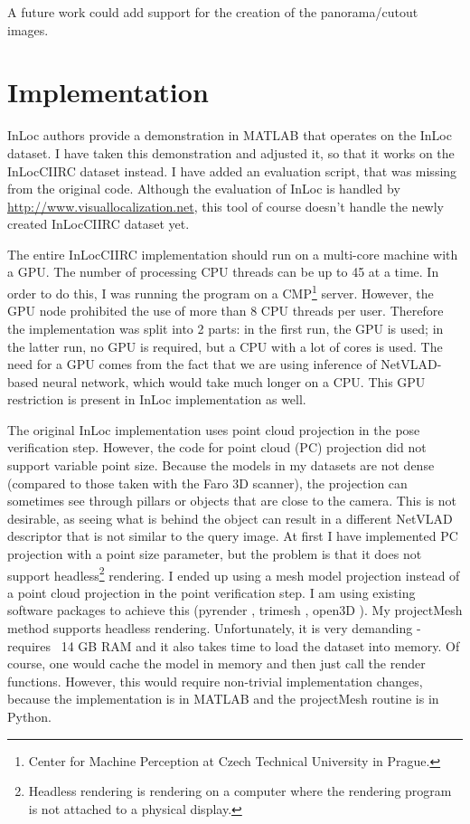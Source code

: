 \documentclass[twoside]{ctuthesis}
\theoremstyle{plain}
\theoremstyle{definition}
\theoremstyle{note}
\newcommand{\code}[1]{{\ttfamily #1%
}}
\begin{document}
A future work could add support for the creation of the panorama/cutout images.

\chapter{Implementation}
\label{chapter:implementation}

InLoc \cite{taira2018inloc} authors provide a demonstration in MATLAB that operates on the InLoc dataset. I have taken this demonstration and adjusted it, so that it works on the InLocCIIRC dataset instead. I have added an evaluation script, that was missing from the original code. Although the evaluation of InLoc is handled by \url{http://www.visuallocalization.net}, this tool of course doesn't handle the newly created InLocCIIRC dataset yet.

The entire InLocCIIRC implementation should run on a multi-core machine with a GPU. The number of processing CPU threads can be up to 45 at a time. In order to do this, I was running the program on a CMP\footnote{Center for Machine Perception at Czech Technical University in Prague.} server. However, the GPU node prohibited the use of more than 8 CPU threads per user. Therefore the implementation was split into 2 parts: in the first run, the GPU is used; in the latter run, no GPU is required, but a CPU with a lot of cores is used. The need for a GPU comes from the fact that we are using inference of NetVLAD-based neural network, which would take much longer on a CPU. This GPU restriction is present in InLoc implementation as well.

The original InLoc implementation uses point cloud projection in the pose verification step. However, the code for point cloud (PC) projection did not support variable point size. Because the models in my datasets are not dense (compared to those taken with the Faro 3D scanner), the projection can sometimes see through pillars or objects that are close to the camera. This is not desirable, as seeing what is behind the object can result in a different NetVLAD descriptor that is not similar to the query image. At first I have implemented PC projection with a point size parameter, but the problem is that it does not support headless\footnote{Headless rendering is rendering on a computer where the rendering program is not attached to a physical display.} rendering. I ended up using a mesh model projection instead of a point cloud projection in the point verification step. I am using existing software packages to achieve this (\code{pyrender}, \code{trimesh}, \code{open3D}). My \code{projectMesh} method supports headless rendering. Unfortunately, it is very demanding - requires ~14 GB RAM and it also takes time to load the dataset into memory. Of course, one would cache the model in memory and then just call the render functions. However, this would require non-trivial implementation changes, because the implementation is in MATLAB and the \code{projectMesh} routine is in Python.
\end{document}
